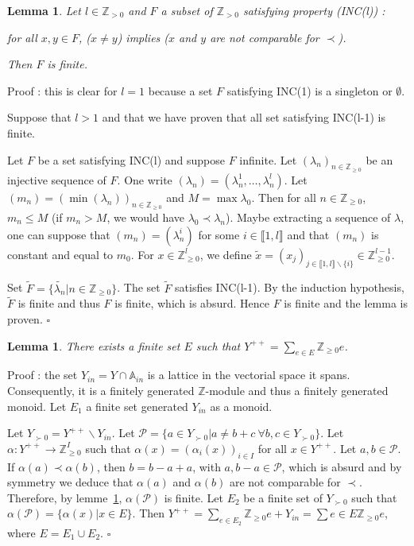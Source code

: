 \documentclass[12pt]{article}
\theoremstyle{plain}
\newtheorem{lemme}[thm]{Lemma}
\theoremstyle{definition}
\newcommand{\A}{\mathbb{A}}
\newcommand{\N}{\mathbb{Z}_{\geq 0}}
\newcommand{\Z}{\mathbb{Z}}
\begin{document}
\begin{lemme}\label{lemme ensembles d'incomparables}
Let $l\in \mathbb{Z}_{>0}$ and $F$ a subset of $\mathbb{Z}_{>0}$ satisfying property (INC(l)) : 

for all $x,y\in F$, ($x\neq y$) implies ($x$ and $y$ are not comparable for $\prec$). 

 Then $F$ is finite.
\end{lemme}

Proof : this  is clear for $l=1$ because a set $F$ satisfying INC(1) is a singleton or $\emptyset$. 

Suppose that $l>1$ and that we have proven that all set satisfying INC(l-1) is finite.

 Let $F$ be a set  satisfying INC(l) and suppose $F$ infinite. Let $(\lambda_n)_{n\in \mathbb{Z}_{\geq 0}}$ be an injective sequence of $F$. One write $(\lambda_n)=(\lambda_n^1,\ldots,\lambda_n^l)$. Let $(m_n)=(\min(\lambda_n))_{n\in \N}$ and $M=\max \lambda_{0}$. Then for all $n\in \mathbb{Z}_{\geq 0}$, $m_n\leq M$ (if $m_n>M$, we would have $\lambda_{0}\prec \lambda_n$). Maybe extracting a sequence of $\lambda$, one can suppose that $(m_n)=(\lambda_n^i)$ for some $i\in \llbracket 1, l\rrbracket$ and that $(m_n)$ is constant and equal to $m_0$. For $x\in \mathbb{Z}_{\geq 0}^l$, we define $\tilde{x}=(x_j)_{j\in \llbracket 1,l\rrbracket\backslash \{i\}}\in \mathbb{Z}_{\geq 0}^{l-1}$. 
 
 Set $\tilde{F}=\{\tilde{\lambda_n}|n\in\mathbb{Z}_{\geq 0}\}$. The set $\tilde{F}$ satisfies INC(l-1). By the induction hypothesis, $\tilde{F}$ is finite and thus $F$ is finite, which is absurd. Hence $F$ is finite and the lemma is proven. $\square$

\begin{lemme}\label{lemme description de Y^{++}}
There exists a finite set $E$ such that $Y^{++}=\sum_{e\in E}\mathbb{Z}_{\geq 0}e$.
\end{lemme}

Proof : the set $Y_{in}=Y\cap\A_{in}$ is a lattice in the vectorial space it spans. Consequently, it is a finitely generated $\Z$-module and thus a finitely generated monoid. Let $E_1$ a finite set generated $Y_{in}$ as a monoid.

 Let $Y_{\succ 0}=Y^{++}\backslash Y_{in}$. Let $\mathcal{P}=\{a\in Y_{\succ 0}|a\neq b+c\ \forall b,c\in Y_{\succ 0}\}$. Let $\alpha:Y^{++}\rightarrow \mathbb{Z}_{\geq 0}^{I}$ such that 
 $\alpha(x)=(\alpha_i(x))_{i\in I}$ for all $x\in Y^{++}$. Let $a,b\in \mathcal{P}$.
  If $\alpha(a)\prec \alpha(b)$, then $b=b-a+a$, with $a,b-a\in \mathcal{P}$, which is absurd and by symmetry we deduce that $\alpha(a)$ and $\alpha(b)$ are not comparable for $\prec$. 
Therefore, by lemme~\ref{lemme ensembles d'incomparables}, $\alpha(\mathcal{P})$ is finite. Let $E_2$ be a finite set of $Y_{\succ 0}$ such that $\alpha(\mathcal{P})=\{\alpha(x)|x\in E\}$. Then $Y^{++}=\sum_{e\in E_2}\mathbb{Z}_{\geq 0}e+Y_{in}=\sum{e\in E}\N e$, where $E=E_1\cup E_2$. $\square$
\end{document}
